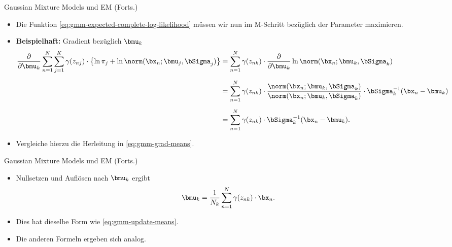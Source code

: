 \begin{frame}{Gaussian Mixture Models und EM (Forts.)}{}
	\begin{itemize}
		\item Die Funktion \eqref{eq:gmm-expected-complete-log-likelihood} müssen wir nun im M-Schritt bezüglich der Parameter maximieren.
		\item \textbf{Beispielhaft:} Gradient bezüglich $\bmu_k$
		\begin{align*}
			\frac{\partial}{\partial \bmu_k} \sum_{n=1}^N \sum_{j=1}^K \gamma(z_{nj}) \cdot
				\bigl\{ \ln \pi_j + \ln \norm(\bx_n; \bmu_j, \bSigma_j) \bigr\}
			&= \sum_{n=1}^N \gamma(z_{nk}) \cdot \frac{\partial}{\partial \bmu_k} \ln \norm(\bx_n; \bmu_k, \bSigma_k)
		\\[2mm]
			&= \sum_{n=1}^N \gamma(z_{nk}) \cdot \frac{\norm(\bx_n; \bmu_k, \bSigma_k)}{\norm(\bx_n; \bmu_k, \bSigma_k)}
				\cdot \bSigma_k^{-1} (\bx_n - \bmu_k)
		\\[2mm]
			&= \sum_{n=1}^N \gamma(z_{nk}) \cdot \bSigma_k^{-1} (\bx_n - \bmu_k).
		\end{align*}
		\item Vergleiche hierzu die Herleitung in \eqref{eq:gmm-grad-means}.
	\end{itemize}
\end{frame}


\begin{frame}{Gaussian Mixture Models und EM (Forts.)}{}
	\begin{itemize}
		\item Nullsetzen und Auflösen nach $\bmu_k$ ergibt $$\bmu_k = \frac{1}{N_k} \sum_{n=1}^N \gamma(z_{nk}) \cdot \bx_n.$$
		\item Dies hat dieselbe Form wie \eqref{eq:gmm-update-means}.
		\item Die anderen Formeln ergeben sich analog.
	\end{itemize}
\end{frame}